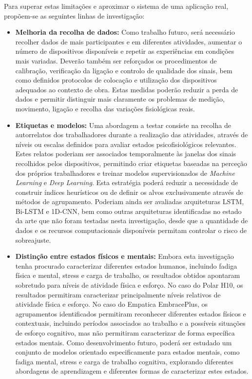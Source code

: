 Para superar estas limitações e aproximar o sistema de uma aplicação real, propõem-se as seguintes linhas de investigação:

\begin{itemize}
\item \textbf{Melhoria da recolha de dados:} 
Como trabalho futuro, será necessário recolher dados de mais participantes e em diferentes atividades, aumentar o número de dispositivos disponíveis e repetir as experiências em condições mais variadas. Deverão também ser reforçados os procedimentos de calibração, verificação da ligação e controlo de qualidade dos sinais, bem como definidos protocolos de colocação e utilização dos dispositivos adequados ao contexto de obra. Estas medidas poderão reduzir a perda de dados e permitir distinguir mais claramente os problemas de medição, movimento, ligação e recolha das variações fisiológicas reais.

\item \textbf{Etiquetas e modelos:} 
Uma abordagem a testar consiste na recolha de autorrelatos dos trabalhadores durante a realização das atividades, através de níveis ou escalas definidos para avaliar estados psicofisiológicos relevantes. Estes relatos poderiam ser associados temporalmente às janelas dos sinais recolhidos pelos dispositivos, permitindo criar etiquetas baseadas na perceção dos próprios trabalhadores e treinar modelos supervisionados de \textit{Machine Learning} e \textit{Deep Learning}. Esta estratégia poderá reduzir a necessidade de construir índices heurísticos ou de definir os alvos exclusivamente através de métodos de agrupamento. Poderiam ainda ser avaliadas arquiteturas LSTM, Bi-LSTM e 1D-CNN, bem como outras arquiteturas identificadas no estado da arte que não foram testadas nesta investigação, desde que a quantidade de dados e os recursos computacionais disponíveis permitam controlar o risco de sobreajuste.

\item \textbf{Distinção entre estados físicos e mentais:} 
Embora esta investigação tenha procurado caracterizar diferentes estados humanos, incluindo fadiga física e mental, stress e carga de trabalho, os resultados obtidos apontaram sobretudo para níveis de atividade física e esforço. No caso do Polar H10, os resultados permitiram caracterizar principalmente níveis relativos de atividade física e esforço. No caso do Empatica EmbracePlus, os agrupamentos identificados permitiram reconhecer diferentes estados físicos e contextuais, incluindo períodos associados ao trabalho e a possíveis situações de esforço cognitivo, mas não permitiram caracterizar de forma específica estados mentais. Como desenvolvimento futuro, poderá ser estudado um conjunto de modelos orientado especificamente para estados mentais, como fadiga mental, stress e carga de trabalho cognitiva, explorando diferentes abordagens de aprendizagem e diferentes formas de caracterizar estes estados.


\end{itemize}
